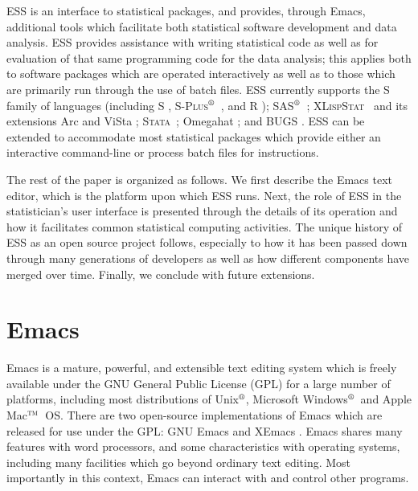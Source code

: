 \documentclass{article}
\newcommand*{\regstrd}{$^{\mbox{\scriptsize{\textregistered}}}$}
\newcommand*{\tm}{$^{\mbox{\scriptsize\sc tm}}$}
\newcommand*{\SAS}{\textsc{SAS}}
\newcommand*{\Splus}{\textsc{S-Plus}}
\newcommand*{\XLispStat}{\textsc{XLispStat}}
\newcommand*{\Stata}{\textsc{Stata}}
\begin{document}
ESS is an interface to statistical packages, and provides, through
Emacs, additional tools which facilitate both statistical software
development and data analysis.  ESS provides assistance with writing
statistical code as well as for evaluation of that same programming
code for the data analysis; this applies both to software packages
which are operated interactively as well as to those which are
primarily run through the use of batch files.  ESS currently supports
the S family of languages (including S
\citep{BecRCW88,ChaJH92,ChaJ98}, \Splus\regstrd\ \citep{Splus}, and R
\citep{ihak:gent:1996}); \SAS\regstrd\ \citep{SAS:8}; \XLispStat\ 
\citep{Tier90} and its extensions Arc \citep{Cook:Weisberg:1999} and
ViSta \citep{youn:fald:mcfa:1992}; \Stata\ \citep{Stata:6.0}; Omegahat
\citep{DTLang:2000}; and BUGS \citep{BUGS}.  ESS can be extended to
accommodate most statistical packages which provide either an
interactive command-line or process batch files for instructions.

The rest of the paper is organized as follows.  We first describe the
Emacs text editor, which is the platform upon which ESS runs.  Next,
the role of ESS in the statistician's user interface is presented
through the details of its operation and how it facilitates common
statistical computing activities.  The unique history of ESS as an
open source project follows, especially to how it has been passed down
through many generations of developers as well as how different
components have merged over time.%
Finally, we conclude with future extensions.

\section{Emacs}
\label{sec:emacs}

Emacs is a mature, powerful, and extensible text editing system which
is freely available under the GNU General Public License (GPL) for a
large number of platforms, including most distributions of
Unix\regstrd, Microsoft Windows\regstrd\ and Apple Mac\tm\ OS.  There
are two open-source implementations of Emacs which are released for
use under the GPL: GNU Emacs \citep{GNU-Emacs} and XEmacs
\citep{XEmacs}.  Emacs shares many features with word processors, and
some characteristics with operating systems, including many facilities
which go beyond ordinary text editing.  Most importantly in this
context, Emacs can interact with and control other programs.
\end{document}
